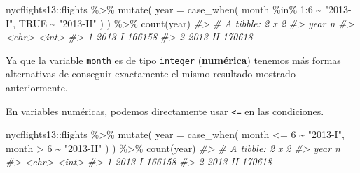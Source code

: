 \documentclass[
]{book}
\newenvironment{Shaded}{\begin{snugshade}}{\end{snugshade}}
\newcommand{\AttributeTok}[1]{\textcolor[rgb]{0.77,0.63,0.00}{#1}}
\newcommand{\CommentTok}[1]{\textcolor[rgb]{0.56,0.35,0.01}{\textit{#1}}}
\newcommand{\ConstantTok}[1]{\textcolor[rgb]{0.00,0.00,0.00}{#1}}
\newcommand{\DecValTok}[1]{\textcolor[rgb]{0.00,0.00,0.81}{#1}}
\newcommand{\FunctionTok}[1]{\textcolor[rgb]{0.00,0.00,0.00}{#1}}
\newcommand{\NormalTok}[1]{#1}
\newcommand{\SpecialCharTok}[1]{\textcolor[rgb]{0.00,0.00,0.00}{#1}}
\newcommand{\StringTok}[1]{\textcolor[rgb]{0.31,0.60,0.02}{#1}}
\begin{document}
\begin{Shaded}
\begin{Highlighting}[]
\NormalTok{nycflights13}\SpecialCharTok{::}\NormalTok{flights }\SpecialCharTok{\%\textgreater{}\%} 
  \FunctionTok{mutate}\NormalTok{(}
    \AttributeTok{year =} \FunctionTok{case\_when}\NormalTok{(}
\NormalTok{      month }\SpecialCharTok{\%in\%} \DecValTok{1}\SpecialCharTok{:}\DecValTok{6} \SpecialCharTok{\textasciitilde{}} \StringTok{"2013{-}I"}\NormalTok{,}
      \ConstantTok{TRUE} \SpecialCharTok{\textasciitilde{}} \StringTok{"2013{-}II"}
\NormalTok{    )}
\NormalTok{  ) }\SpecialCharTok{\%\textgreater{}\%} 
  \FunctionTok{count}\NormalTok{(year)}
\CommentTok{\#\textgreater{} \# A tibble: 2 x 2}
\CommentTok{\#\textgreater{}   year         n}
\CommentTok{\#\textgreater{}   \textless{}chr\textgreater{}    \textless{}int\textgreater{}}
\CommentTok{\#\textgreater{} 1 2013{-}I  166158}
\CommentTok{\#\textgreater{} 2 2013{-}II 170618}
\end{Highlighting}
\end{Shaded}

Ya que la variable \texttt{month} es de tipo \texttt{integer} (\textbf{numérica}) tenemos más formas alternativas de conseguir exactamente el mismo resultado mostrado anteriormente.

En variables numéricas, podemos directamente usar \texttt{\textless{}=} en las condiciones.

\begin{Shaded}
\begin{Highlighting}[]
\NormalTok{nycflights13}\SpecialCharTok{::}\NormalTok{flights }\SpecialCharTok{\%\textgreater{}\%} 
  \FunctionTok{mutate}\NormalTok{(}
    \AttributeTok{year =} \FunctionTok{case\_when}\NormalTok{(}
\NormalTok{      month }\SpecialCharTok{\textless{}=} \DecValTok{6} \SpecialCharTok{\textasciitilde{}} \StringTok{"2013{-}I"}\NormalTok{,}
\NormalTok{      month }\SpecialCharTok{\textgreater{}} \DecValTok{6} \SpecialCharTok{\textasciitilde{}} \StringTok{"2013{-}II"}
\NormalTok{    )}
\NormalTok{  ) }\SpecialCharTok{\%\textgreater{}\%} 
  \FunctionTok{count}\NormalTok{(year)}
\CommentTok{\#\textgreater{} \# A tibble: 2 x 2}
\CommentTok{\#\textgreater{}   year         n}
\CommentTok{\#\textgreater{}   \textless{}chr\textgreater{}    \textless{}int\textgreater{}}
\CommentTok{\#\textgreater{} 1 2013{-}I  166158}
\CommentTok{\#\textgreater{} 2 2013{-}II 170618}
\end{Highlighting}
\end{Shaded}
\end{document}
